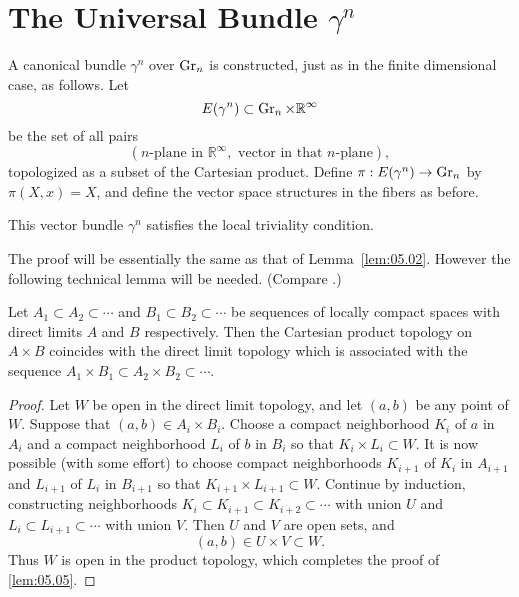 \documentclass[../main]{subfiles}
\begin{document}
\section{The Universal Bundle \texorpdfstring{$\gamma^n$}{gamma n}}\label{5.2}

A canonical bundle $\gamma^n$ over $\operatorname{Gr}_n$ is constructed, just as in the finite
dimensional case, as follows. Let 
\[
E(\gamma^n)\subset \operatorname{Gr}_n\times {\mathbb R}^\infty
\]
be the set of all pairs
\[
(n\text{-plane in }{\mathbb R}^\infty,\text{ vector in that $n$-plane}),
\]
topologized as a subset of the Cartesian product. Define $\pi: E(\gamma^n) \to \operatorname{Gr}_n$
by $\pi(X, x) = X$, and define the vector space structures in the fibers as
before.

\begin{lemma}\label{lem:05.04}
 This vector bundle $\gamma^n$ satisfies the local triviality
condition.
\end{lemma}
The proof will be essentially the same as that of Lemma~\ref{lem:05.02}. However the
following technical lemma will be needed. (Compare \cite[\S18.5]{whitehead1961}.)
\begin{lemma}\label{lem:05.05} Let $A_1 \subset A_2 \subset \cdots$ and $B_1 \subset B_2 \subset \cdots$ be sequences
of locally compact spaces with direct limits $A$ and $B$ respectively. Then the Cartesian product topology on $A \times B$ coincides
with the direct limit topology which is associated with the sequence $A_1 \times B_1 \subset A_2 \times B_2 \subset\cdots$.
\end{lemma}
\begin{proof} Let $W$ be open in the direct limit topology, and let $(a, b)$ be
any point of $W$. Suppose that $(a, b) \in A_i \times B_i$. Choose a compact neighborhood $K_i$ of $a$ in $A_i$ and a compact neighborhood $L_i$ of $b$ in $B_i$
so that $K_i \times L_i \subset W$. It is now possible (with some effort) to choose compact neighborhoods $K_{i+1}$ of $K_i$ in $A_{i+1}$ and $L_{i+1}$ of $L_i$ in $B_{i+1}$ so
that $K_{i+1} \times L_{i+1}\subset  W$. Continue by induction, constructing neighborhoods
$K_i \subset K_{i+1} \subset K_{i+2} \subset\cdots$ with union $U$ and $L_i \subset L_{i+1} \subset \cdots$ with union $V$.
Then $U$ and $V$ are open sets, and
\[
(a, b) \in U \times V \subset W.
\]
Thus $W$ is open in the product topology, which completes the proof of \ref{lem:05.05}.
\end{proof}
\end{document}
